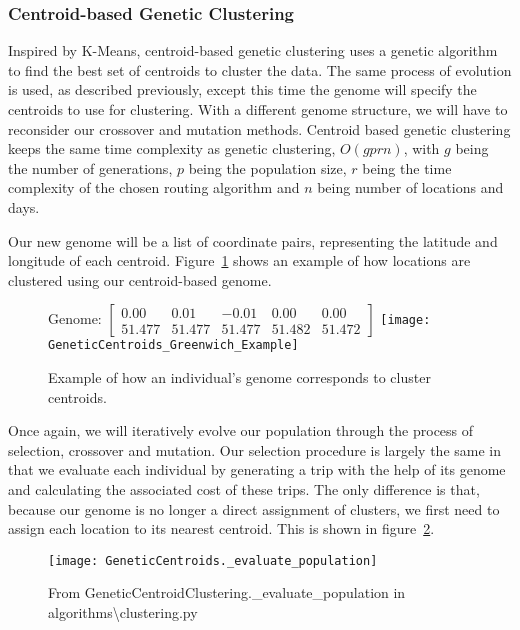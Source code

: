
\subsubsection{Centroid-based Genetic Clustering}
Inspired by K-Means, centroid-based genetic clustering uses a genetic algorithm to find the best set of centroids
to cluster the data.
The same process of evolution is used, as described previously, except this time the genome will specify the
centroids to use for clustering.
With a different genome structure, we will have to reconsider our crossover and mutation methods.
Centroid based genetic clustering keeps the same time complexity as genetic clustering, $O(g p r n)$, with $g$
being the number of generations, $p$ being the population size, $r$ being the time complexity of the chosen
routing algorithm and $n$ being number of locations and days.\\

\noindent
Our new genome will be a list of coordinate pairs, representing the latitude and longitude of each centroid.
Figure~\ref{fig:GeneticCentroids_Greenwich_Example} shows an example of how locations are clustered using our centroid-based genome.
\begin{figure}[H]
    \centering
    Genome: $\begin{bmatrix}0.00 & 0.01 & -0.01 & 0.00 & 0.00\\51.477 & 51.477 & 51.477 & 51.482 & 51.472\end{bmatrix}$
    \texttt{[image: GeneticCentroids\_Greenwich\_Example]}
    \caption{Example of how an individual's genome corresponds to cluster centroids.}
    \label{fig:GeneticCentroids_Greenwich_Example}
\end{figure}

\noindent
Once again, we will iteratively evolve our population through the process of selection, crossover and mutation.
Our selection procedure is largely the same in that we evaluate each individual by generating a trip with the help
of its genome and calculating the associated cost of these trips.
The only difference is that, because our genome is no longer a direct assignment of clusters, we first need to
assign each location to its nearest centroid.
This is shown in figure~\ref{fig:GeneticCentroids._evaluate_population}.
\begin{figure}[H]
    \centering
    \texttt{[image: GeneticCentroids.\_evaluate\_population]}
    \caption{From GeneticCentroidClustering.\_evaluate\_population in algorithms\textbackslash clustering.py}
    \label{fig:GeneticCentroids._evaluate_population}
\end{figure}

